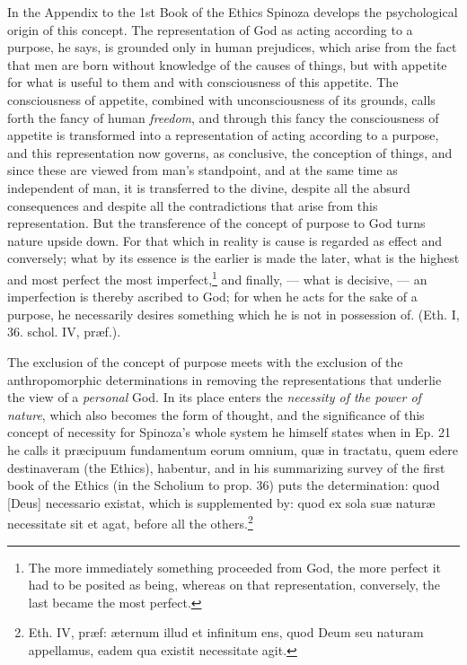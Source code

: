 \documentclass[12pt,a4paper,openany]{book}
\newcommand{\opage}[1]{\marginnote{\footnotesize\textit{[#1]}}}
\begin{document}
In the Appendix to the 1st Book of the Ethics Spinoza develops the
psychological origin of this concept. The representation of
\opage{67}\setcounter{footnote}{0}God as acting according to a purpose, he says, is grounded only in
human prejudices, which arise from the fact that men are born
without knowledge of the causes of things, but with appetite for what is
useful to them and with consciousness of this appetite. The consciousness of
appetite, combined with unconsciousness of its grounds, calls forth
the fancy of human \emph{freedom}, and through this
fancy the consciousness of appetite is transformed into a
representation of acting according to a purpose, and this representation
now governs, as conclusive, the conception of things, and since
these are viewed from man's standpoint, and at the same time as
independent of man, it is transferred to the divine,
despite all the absurd consequences and despite all the contradictions
that arise from this representation. But the transference of the
concept of purpose to God turns nature upside down. For that
which in reality is cause is regarded as effect and
conversely; what by its essence is the earlier is made
the later, what is the highest and most perfect the
most imperfect,\footnote{The more immediately something proceeded from God,
the more perfect it had to be posited as being, whereas on that
representation, conversely, the last became the most perfect.} and
finally, --- what is decisive, --- an imperfection is thereby ascribed
to God; for when he acts for the sake of a purpose,
he necessarily desires something which he is not in possession
of. (Eth. I, 36. schol. IV, præf.).

The exclusion of the concept of purpose meets with the exclusion of the
anthropomorphic determinations in removing the representations
that underlie the view of a \emph{personal} God. In its
place enters the \emph{necessity of the power of nature}, which also becomes the
form of thought, and the significance of this concept of necessity for
Spinoza's whole system he himself states when in Ep. 21 he calls
it præcipuum fundamentum eorum omnium, quæ in tractatu, quem
edere destinaveram (the Ethics), habentur, and in his summarizing
\opage{68}\setcounter{footnote}{0}survey of the first book of the Ethics (in the Scholium to prop. 36)
puts the determination: quod [Deus] necessario existat, which
is supplemented by: quod ex sola suæ naturæ necessitate sit et agat,
before all the others.\footnote{Eth. IV, præf: æternum illud et
infinitum ens, quod Deum seu naturam appellamus, eadem qua
existit necessitate agit.}
\end{document}
